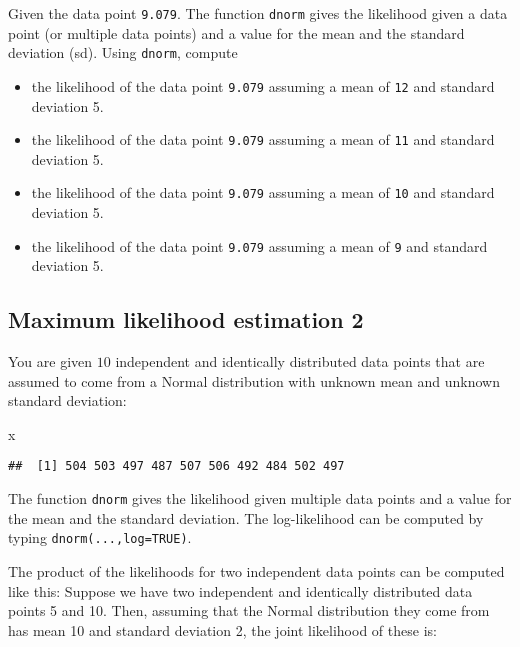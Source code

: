\documentclass[12pt,]{krantz}
\newenvironment{Shaded}{\begin{snugshade}}{\end{snugshade}}
\newcommand{\NormalTok}[1]{#1}
\providecommand{\tightlist}{%
  \setlength{\itemsep}{0pt}\setlength{\parskip}{0pt}}
\begin{document}
Given the data point \texttt{9.079}.
The function \texttt{dnorm} gives the likelihood given a data point (or multiple data points) and a value for the mean and the standard deviation (sd). Using \texttt{dnorm}, compute

\begin{itemize}
\tightlist
\item
  the likelihood of the data point \texttt{9.079} assuming a mean of \texttt{12} and standard deviation 5.
\item
  the likelihood of the data point \texttt{9.079} assuming a mean of \texttt{11} and standard deviation 5.
\item
  the likelihood of the data point \texttt{9.079} assuming a mean of \texttt{10} and standard deviation 5.
\item
  the likelihood of the data point \texttt{9.079} assuming a mean of \texttt{9} and standard deviation 5.
\end{itemize}

\hypertarget{maximum-likelihood-estimation-2}{%
\subsection{Maximum likelihood estimation 2}\label{maximum-likelihood-estimation-2}}

You are given \(10\) independent and identically distributed data points that are assumed to come from a Normal distribution with unknown mean and unknown standard deviation:

\begin{Shaded}
\begin{Highlighting}[]
\NormalTok{x}
\end{Highlighting}
\end{Shaded}

\begin{verbatim}
##  [1] 504 503 497 487 507 506 492 484 502 497
\end{verbatim}

The function \texttt{dnorm} gives the likelihood given multiple data points and a value for the mean and the standard deviation. The log-likelihood can be computed by typing \texttt{dnorm(...,log=TRUE)}.

The product of the likelihoods for two independent data points can be computed like this: Suppose we have two independent and identically distributed data points 5 and 10. Then, assuming that the Normal distribution they come from has mean 10 and standard deviation 2, the joint likelihood of these is:
\end{document}
